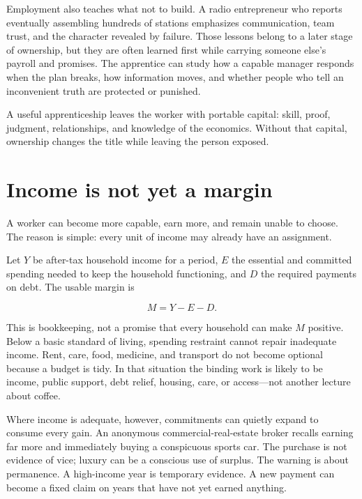 Employment also teaches what not to build. A radio entrepreneur who reports
eventually assembling hundreds of stations emphasizes communication, team
trust, and the character revealed by failure. Those lessons belong to a later
stage of ownership, but they are often learned first while carrying someone
else's payroll and promises. The apprentice can study how a capable manager
responds when the plan breaks, how information moves, and whether people who
tell an inconvenient truth are protected or punished.

A useful apprenticeship leaves the worker with portable capital: skill, proof,
judgment, relationships, and knowledge of the economics. Without that capital,
ownership changes the title while leaving the person exposed.

\section{Income is not yet a margin}

A worker can become more capable, earn more, and remain unable to choose. The
reason is simple: every unit of income may already have an assignment.

Let $Y$ be after-tax household income for a period, $E$ the essential and
committed spending needed to keep the household functioning, and $D$ the
required payments on debt. The usable margin is

\begin{equation}
M = Y - E - D.
\end{equation}

This is bookkeeping, not a promise that every household can make $M$ positive.
Below a basic standard of living, spending restraint cannot repair inadequate
income. Rent, care, food, medicine, and transport do not become optional
because a budget is tidy. In that situation the binding work is likely to be
income, public support, debt relief, housing, care, or access---not another
lecture about coffee.

Where income is adequate, however, commitments can quietly expand to consume
every gain. An anonymous commercial-real-estate broker recalls earning far more
and immediately buying a conspicuous sports car. The purchase is not evidence
of vice; luxury can be a conscious use of surplus. The warning is about
permanence. A high-income year is temporary evidence. A new payment can become
a fixed claim on years that have not yet earned anything.

